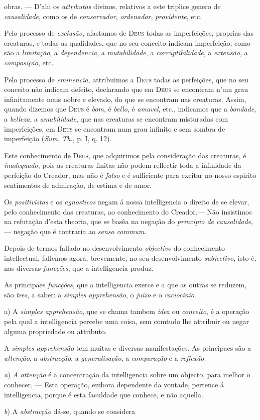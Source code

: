 obras. --- D'ahi os \emph{attributos} divinos, relativos a este triplice genero de \emph{causalidade}, como os de \emph{conservador}, \emph{ordenador}, \emph{providente}, etc.\par Pelo processo de \emph{exclusão}, afastamos de \textsc{Deus} todas as imperfeições, proprias das creaturas, e todas as qualidades, que no seu conceito indicam imperfeição; como são a \emph{limitação}, a \emph{dependencia}, a \emph{mutabilidade}, a \emph{corruptibilidade}, a \emph{extensão}, a \emph{composição}, etc.\par Pelo processo de \emph{eminencia}, attribuimos a \textsc{Deus} todas as perfeições, que no seu conceito não indicam defeito, declarando que em \textsc{Deus} se encontram n'um grau infinitamente mais nobre e elevado, do que se encontram nas creaturas. Assim, quando dizemos que \textsc{Deus} é \emph{bom}, é \emph{bello}, é \emph{amavel}, etc., indicamos que a \emph{bondade}, a \emph{belleza}, a \emph{amabilidade}, que nas creaturas se encontram misturadas com imperfeições, em \textsc{Deus} se encontram num grau infinito e sem sombra de imperfeição (\emph{Sum}. \emph{Th}., p. I, q. 12).\par Este conhecimento de \textsc{Deus}, que adquirimos pela consideração das creaturas, é \emph{inadequado}, pois as creaturas finitas não podem reflectir toda a infinidade da perfeição do Creador, mas não é \emph{falso} e é sufficiente para excitar no nosso espirito sentimentos de admiração, de estima e de amor.\par Os \emph{positivistas} e os \emph{agnosticos} negam á nossa intelligencia o direito de se elevar, pelo conhecimento das creaturas, ao conhecimento do Creador.--- Não insistimos na refutação d'esta theoria, que se basêa na negação do \emph{principio de causalidade}, --- negação que é contraria ao \emph{senso commum}.\par *\par Depois de termos fallado no desenvolvimento \emph{objectivo} do conhecimento intellectual, fallemos agora, brevemente, no seu desenvolvimento \emph{subjectivo}, isto é, nas diversas \emph{funcções}, que a intelligencia produz.\par As principaes \emph{funcções}, que a intelligencia exerce e a que as outras se reduzem, são \emph{tres}, a saber: a \emph{simples apprehensão}, o \emph{juizo} e o \emph{raciocinio}.\par a) A \emph{simples apprehensão}, que se chama tambem \emph{idea} ou \emph{conceito}, é a operação pela qual a intelligencia percebe uma coisa, sem comtudo lhe attribuir ou negar alguma propriedade ou attributo.\par A \emph{simples apprehensão} tem muitas e diversas manifestações. As principaes são a \emph{attenção}, a \emph{abstracção}, a \emph{generalisação}, a \emph{comparação} e a \emph{reflexão}.\par \emph{a}) \emph{A attenção} é a concentração da intelligencia sobre um objecto, para melhor o conhecer. --- Esta operação, embora dependente da vontade, pertence á intelligencia, porque é esta faculdade que conhece, e não aquella.\par \emph{b}) A \emph{abstracção} dá-se, quando se considera 